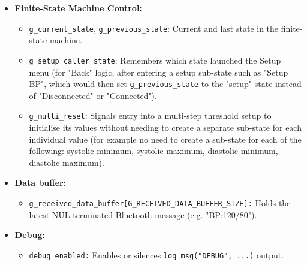 \begin{itemize}
	\item \textbf{Finite-State Machine Control:}
	\begin{itemize}
		\item \lstinline|g_current_state|, \lstinline|g_previous_state|: Current and last state in the finite-state machine.
		\item \lstinline|g_setup_caller_state|: Remembers which state launched the Setup menu (for "Back" logic, after entering a setup sub-state such as "Setup BP", which would then set \lstinline|g_previous_state| to the "setup" state instead of "Disconnected" or "Connected").
		\item \lstinline|g_multi_reset|: Signals entry into a multi-step threshold setup to initialise its values without needing to create a separate sub-state for each individual value (for example no need to create a sub-state for each of the following: systolic minimum, systolic maximum, diastolic minimum, diastolic maximum).
	\end{itemize}

	\item \textbf{Data buffer:}
	\begin{itemize}
		\item \lstinline|g_received_data_buffer[G_RECEIVED_DATA_BUFFER_SIZE]:| Holds the latest NUL-terminated Bluetooth message (e.g. "BP:120/80").
	\end{itemize}
	
	\item \textbf{Debug:}
	\begin{itemize}
		\item \lstinline|debug_enabled:| Enables or silences \lstinline|log_msg("DEBUG", ...)| output.
	\end{itemize}
\end{itemize}

